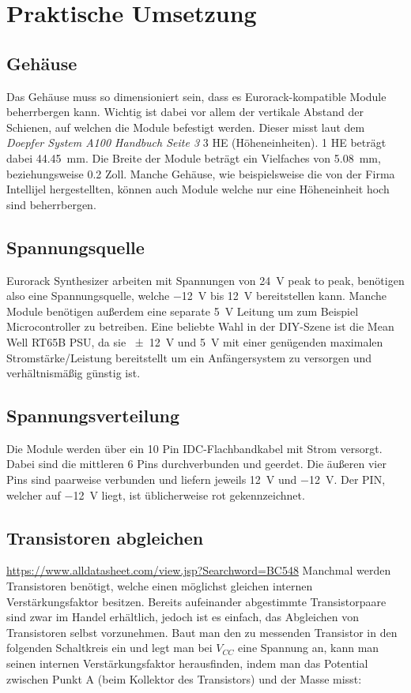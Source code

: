\chapter{Praktische Umsetzung}

\section{Gehäuse}
\label{sec:orgc5550c2}
Das Gehäuse muss so dimensioniert sein, dass es Eurorack-kompatible Module beherrbergen kann. Wichtig ist dabei vor allem der vertikale Abstand der Schienen, auf welchen die Module befestigt werden. Dieser misst laut dem \emph{Doepfer System A100 Handbuch Seite 3} 3 HE (Höheneinheiten). 1 HE beträgt dabei \SI{44.45}{\milli\meter}. Die Breite der Module beträgt ein Vielfaches von \SI{5.08}{\milli\meter}, beziehungsweise 0.2 Zoll. Manche Gehäuse, wie beispielsweise die von der Firma Intellijel hergestellten, können auch Module welche nur eine Höheneinheit hoch sind beherrbergen.

\section{Spannungsquelle}
\label{sec:org97c72bd}
Eurorack Synthesizer arbeiten mit Spannungen von \SI{24}{\volt} peak to peak, benötigen also eine Spannungsquelle, welche \SI{-12}{\volt} bis \SI{+12}{\volt} bereitstellen kann. Manche Module benötigen außerdem eine separate \SI{5}{\volt} Leitung um zum Beispiel Microcontroller zu betreiben. Eine beliebte Wahl in der DIY-Szene ist die Mean Well RT65B PSU, da sie \SI{\pm 12}{\volt} und \SI{5}{\volt} mit einer genügenden maximalen Stromstärke/Leistung bereitstellt um ein Anfängersystem zu versorgen und verhältnismäßig günstig ist.

\section{Spannungsverteilung}
\label{sec:orgf2f9fb4}
Die Module werden über ein 10 Pin IDC-Flachbandkabel mit Strom versorgt. Dabei sind die mittleren 6 Pins durchverbunden und geerdet. Die äußeren vier Pins sind paarweise verbunden und liefern jeweils \SI{+12}{\volt} und \SI{-12}{\volt}. Der PIN, welcher auf \SI{-12}{\volt} liegt, ist üblicherweise rot gekennzeichnet.

\section{Transistoren abgleichen}
\label{sec:org206c04b}
\url{https://www.alldatasheet.com/view.jsp?Searchword=BC548}
Manchmal werden Transistoren benötigt, welche einen möglichst gleichen internen Verstärkungsfaktor besitzen. Bereits aufeinander abgestimmte Transistorpaare sind zwar im Handel erhältlich, jedoch ist es einfach, das Abgleichen von Transistoren selbst vorzunehmen. Baut man den zu messenden Transistor in den folgenden Schaltkreis ein und legt man bei \(V_{CC}\) eine Spannung an, kann man seinen internen Verstärkungsfaktor herausfinden, indem man das Potential zwischen Punkt A (beim Kollektor des Transistors) und der Masse misst:

